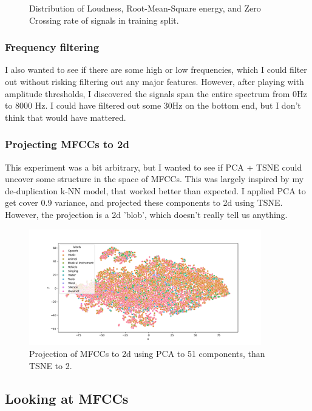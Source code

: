 \documentclass[11pt]{article}
\begin{document}
\begin{figure}
    \caption{Distribution of Loudness, Root-Mean-Square energy, and Zero
    Crossing rate of signals in training split.}\label{figure:features}

\end{figure}

\subsubsection{Frequency filtering}

I also wanted to see if there are some high or low frequencies, which I could
filter out without risking filtering out any major features. However, after
playing with amplitude thresholds, I discovered the signals span the entire
spectrum from 0Hz to 8000 Hz. I could have filtered out some 30Hz on the bottom
end, but I don't think that would have mattered.

\subsubsection{Projecting MFCCs to 2d}

This experiment was a bit arbitrary, but I wanted to see if PCA + TSNE could
uncover some structure in the space of MFCCs. This was largely inspired by my
de-duplication k-NN model, that worked better than expected. I applied PCA to
get cover 0.9 variance, and projected these components to 2d using TSNE.
However, the projection is a 2d 'blob', which doesn't really tell us anything.

\begin{figure}
  \centering
  \includegraphics[width=0.9\textwidth]{../notebooks/imgs/pca_mfccs.png}

  \caption{Projection of MFCCs to 2d using PCA to 51 components, than TSNE to 2.}
\end{figure}

\subsection{Looking at MFCCs}
\end{document}
